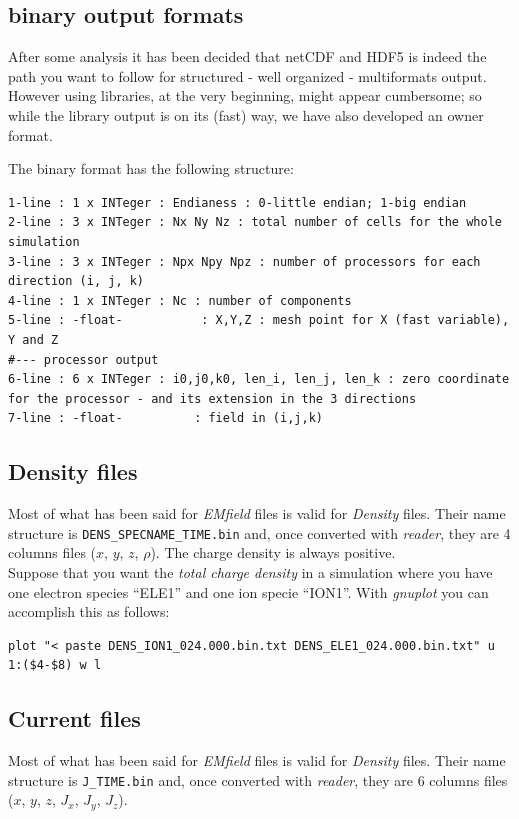 \documentclass[11pt,a4paper]{report}
\begin{document}
\subsection{binary output formats}
After some analysis it has been decided that netCDF and HDF5 is indeed the path you want to follow for structured - well organized - multiformats output.
However using libraries, at the very beginning, might appear cumbersome; so while the library output is on its (fast) way, we have also developed an owner format.

The binary format has the following structure:
\begin{verbatim}
1-line : 1 x INTeger : Endianess : 0-little endian; 1-big endian
2-line : 3 x INTeger : Nx Ny Nz : total number of cells for the whole simulation
3-line : 3 x INTeger : Npx Npy Npz : number of processors for each direction (i, j, k)
4-line : 1 x INTeger : Nc : number of components
5-line : -float-           : X,Y,Z : mesh point for X (fast variable), Y and Z
#--- processor output
6-line : 6 x INTeger : i0,j0,k0, len_i, len_j, len_k : zero coordinate for the processor - and its extension in the 3 directions
7-line : -float-          : field in (i,j,k)
\end{verbatim}



\subsection{Density files}
Most of what has been said for \emph{EMfield} files is valid for \emph{Density} files. Their name structure is \verb+DENS_SPECNAME_TIME.bin+ and, once converted with \emph{reader}, they are 4 columns files ($x$, $y$, $z$, $\rho$). The charge density is always positive.\\
Suppose that you want the \emph{total charge density} in a simulation where you have one electron species ``ELE1'' and one ion specie ``ION1''. With \emph{gnuplot} you can accomplish this as follows:
\begin{verbatim}
plot "< paste DENS_ION1_024.000.bin.txt DENS_ELE1_024.000.bin.txt" u 1:($4-$8) w l
\end{verbatim}

\subsection{Current files}
Most of what has been said for \emph{EMfield} files is valid for \emph{Density} files. Their name structure is \verb+J_TIME.bin+ and, once converted with \emph{reader}, they are 6 columns files ($x$, $y$, $z$, $J_x$, $J_y$, $J_z$). 
\end{document}
